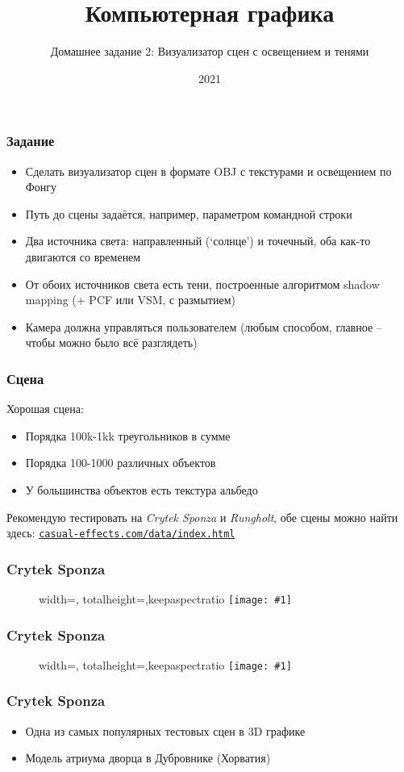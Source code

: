 \documentclass{beamer}
\title{Компьютерная графика}
\subtitle{Домашнее задание 2: Визуализатор сцен с освещением и тенями}
\date{2021}
\newcommand{\slideimage}[1]{
  \begin{figure}
    \begin{adjustbox}{width=\textwidth, totalheight=\textheight-2\baselineskip-2\baselineskip,keepaspectratio}
      \texttt{[image: \#1]}
    \end{adjustbox}
  \end{figure}
}
\begin{document}
\frame{\titlepage}

\begin{frame}[fragile]
\frametitle{Задание}
\begin{itemize}
\item Сделать визуализатор сцен в формате OBJ с текстурами и освещением по Фонгу
\pause
\item Путь до сцены задаётся, например, параметром командной строки
\pause
\item Два источника света: направленный (`солнце') и точечный, оба как-то двигаются со временем
\pause
\item От обоих источников света есть тени, построенные алгоритмом shadow mapping (+ PCF или VSM, с размытием)
\pause
\item Камера должна управляться пользователем (любым способом, главное -- чтобы можно было всё разглядеть)
\end{itemize}
\end{frame}

\begin{frame}[fragile]
\frametitle{Сцена}
Хорошая сцена:
\begin{itemize}
\item Порядка 100k-1kk треугольников в сумме
\item Порядка 100-1000 различных объектов
\item У большинства объектов есть текстура альбедо
\end{itemize}
Рекомендую тестировать на \textit{Crytek Sponza} и \textit{Rungholt}, обе сцены можно найти здесь: \href{https://casual-effects.com/data/index.html}{\nolinkurl{casual-effects.com/data/index.html}}
\end{frame}

\begin{frame}[fragile]
\frametitle{Crytek Sponza}
\slideimage{crytek-sponza.jpg}
\end{frame}

\begin{frame}[fragile]
\frametitle{Crytek Sponza}
\slideimage{sponza_real.jpeg}
\end{frame}

\begin{frame}[fragile]
\frametitle{Crytek Sponza}
\begin{itemize}
\item Одна из самых популярных тестовых сцен в 3D графике
\item Модель атриума дворца в Дубровнике (Хорватия)
\end{itemize}
\end{frame}
\end{document}
